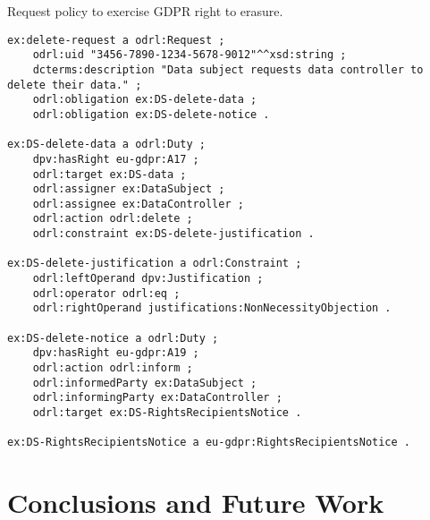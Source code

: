\documentclass{IOS-Book-Article}     %
\begin{document}
\begin{listing}
\caption{Request policy to exercise GDPR right to erasure.}
\label{lst:policy}
\begin{verbatim}
ex:delete-request a odrl:Request ;
    odrl:uid "3456-7890-1234-5678-9012"^^xsd:string ;
    dcterms:description "Data subject requests data controller to delete their data." ;
    odrl:obligation ex:DS-delete-data ;
    odrl:obligation ex:DS-delete-notice .

ex:DS-delete-data a odrl:Duty ;
    dpv:hasRight eu-gdpr:A17 ;
    odrl:target ex:DS-data ;
    odrl:assigner ex:DataSubject ;
    odrl:assignee ex:DataController ;
    odrl:action odrl:delete ;
    odrl:constraint ex:DS-delete-justification .

ex:DS-delete-justification a odrl:Constraint ;
    odrl:leftOperand dpv:Justification ;
    odrl:operator odrl:eq ;
    odrl:rightOperand justifications:NonNecessityObjection .

ex:DS-delete-notice a odrl:Duty ;
    dpv:hasRight eu-gdpr:A19 ;
    odrl:action odrl:inform ;
    odrl:informedParty ex:DataSubject ;
    odrl:informingParty ex:DataController ;
    odrl:target ex:DS-RightsRecipientsNotice .

ex:DS-RightsRecipientsNotice a eu-gdpr:RightsRecipientsNotice .
\end{verbatim}
\end{listing}

\section{Conclusions and Future Work}
\label{sec:conclusions}



\end{document}
